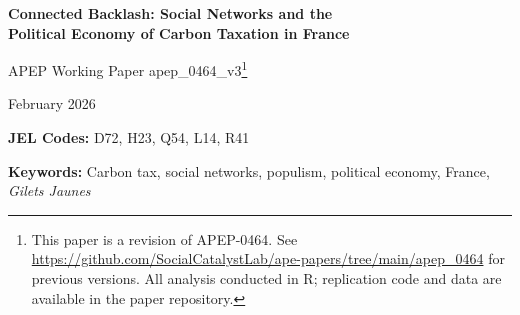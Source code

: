 \documentclass[12pt]{article}
\newcommand{\rn}{Rassemblement National}
\newcommand{\dept}{d\'{e}partement}
\newcommand{\depts}{d\'{e}partements}
\begin{document}

\begin{titlepage}
\begin{center}
\vspace*{1cm}

{\LARGE\bfseries Connected Backlash: Social Networks and the\\
Political Economy of Carbon Taxation in France}

\vspace{1cm}

{\large APEP Working Paper apep\_0464\_v3\footnote{This paper is a revision of APEP-0464. See \url{https://github.com/SocialCatalystLab/ape-papers/tree/main/apep_0464} for previous versions. All analysis conducted in R; replication code and data are available in the paper repository.}}

\vspace{0.5cm}

{\large February 2026}

\vspace{1cm}

\begin{abstract}
\noindent On November 17, 2018, 300,000 French citizens donned yellow vests to protest a carbon tax---but the protests spread far beyond where the tax hit hardest. This paper shows that social networks transmitted the backlash. Using Facebook's Social Connectedness Index to measure ties between French \depts{}, I construct a shift-share measure of network exposure to fuel-vulnerable communities. At the \dept{}-level ($N = 960$), a one-standard-deviation increase in network exposure raises \rn{} vote share by 1.35 percentage points after the carbon tax, significant under shift-share-robust inference \citep{adao2019shift}. An event study shows a sharp structural break at 2014 with no positive pre-trend. The effect is absent for Green and center-right parties, robust to a pre-treatment migration-based network proxy, individual time-varying controls, and distance restrictions isolating social from geographic proximity. A spatial dependence analysis bounds the total network effect between 1.35 pp (reduced-form) and approximately 11 pp (structural upper bound).
\end{abstract}

\vspace{0.3cm}

\textbf{JEL Codes:} D72, H23, Q54, L14, R41

\textbf{Keywords:} Carbon tax, social networks, populism, political economy, France, \textit{Gilets Jaunes}

\end{center}
\end{titlepage}
\end{document}
